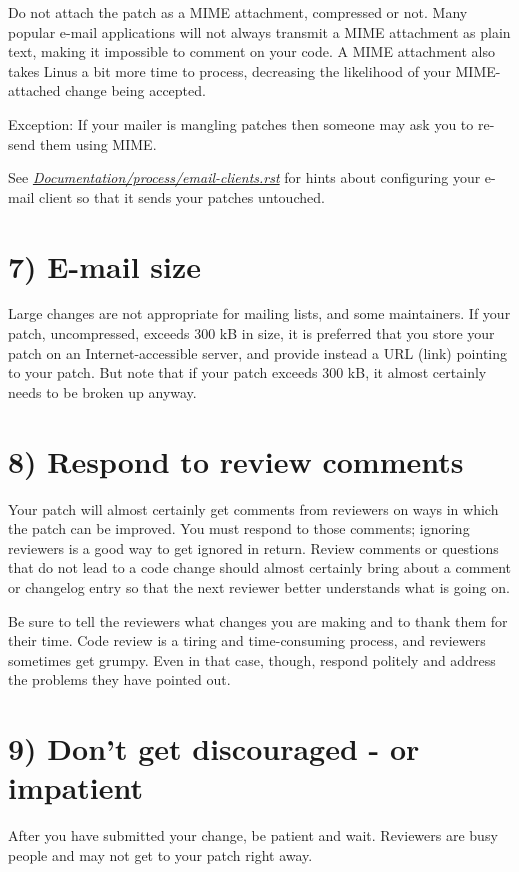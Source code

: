 \documentclass[a4paper,8pt,english]{sphinxmanual}
\begin{document}
Do not attach the patch as a MIME attachment, compressed or not.
Many popular e-mail applications will not always transmit a MIME
attachment as plain text, making it impossible to comment on your
code.  A MIME attachment also takes Linus a bit more time to process,
decreasing the likelihood of your MIME-attached change being accepted.

Exception:  If your mailer is mangling patches then someone may ask
you to re-send them using MIME.

See {\hyperref[process/email\string-clients:email\string-clients]{\emph{Documentation/process/email-clients.rst}}}
for hints about configuring your e-mail client so that it sends your patches
untouched.


\section{7) E-mail size}
\label{process/submitting-patches:e-mail-size}
Large changes are not appropriate for mailing lists, and some
maintainers.  If your patch, uncompressed, exceeds 300 kB in size,
it is preferred that you store your patch on an Internet-accessible
server, and provide instead a URL (link) pointing to your patch.  But note
that if your patch exceeds 300 kB, it almost certainly needs to be broken up
anyway.


\section{8) Respond to review comments}
\label{process/submitting-patches:respond-to-review-comments}
Your patch will almost certainly get comments from reviewers on ways in
which the patch can be improved.  You must respond to those comments;
ignoring reviewers is a good way to get ignored in return.  Review comments
or questions that do not lead to a code change should almost certainly
bring about a comment or changelog entry so that the next reviewer better
understands what is going on.

Be sure to tell the reviewers what changes you are making and to thank them
for their time.  Code review is a tiring and time-consuming process, and
reviewers sometimes get grumpy.  Even in that case, though, respond
politely and address the problems they have pointed out.


\section{9) Don't get discouraged - or impatient}
\label{process/submitting-patches:don-t-get-discouraged-or-impatient}
After you have submitted your change, be patient and wait.  Reviewers are
busy people and may not get to your patch right away.
\end{document}
